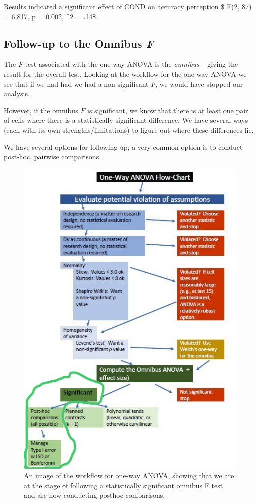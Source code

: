 \documentclass[
  english,
]{book}
\begin{document}
Results indicated a significant effect of COND on accuracy perception \$ F(2, 87) = 6.817, p = 0.002, \eta\^{}2 = .14\$.

\hypertarget{follow-up-to-the-omnibus-f}{%
\subsection{\texorpdfstring{Follow-up to the Omnibus \emph{F}}{Follow-up to the Omnibus F}}\label{follow-up-to-the-omnibus-f}}

The \emph{F}-test associated with the one-way ANOVA is the \emph{omnibus} -- giving the result for the overall test. Looking at the workflow for the one-way ANOVA we see that if we had had we had a non-significant \(F\), we would have stopped our analysis.

However, if the omnibus \(F\) is significant, we know that there is at least one pair of cells where there is a statistically significant difference. We have several ways (each with its own strengths/limitations) to figure out where these differences lie.

We have several options for following up; a very common option is to conduct post-hoc, pairwise comparisons.

\begin{figure}
\centering
\includegraphics{images/OnewayWrkFlw_phoc.jpg}
\caption{An image of the workflow for one-way ANOVA, showing that we are at the stage of following a statistically significant omnibus F test and are now conducting posthoc comparisons.}
\end{figure}
\end{document}
